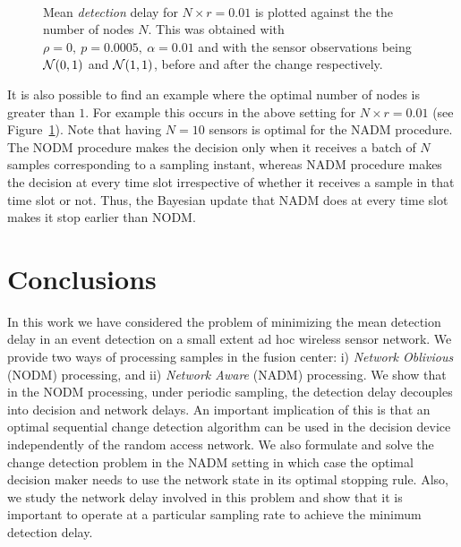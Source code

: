 \documentclass[acmtosn]{acmtrans2m}
\begin{document}
 
 \begin{figure}
   \centering \ 
   \caption{Mean \emph{detection} delay for $N\times r=0.01$ is plotted
     against the the number of nodes $N$. This was obtained with 
     $\rho=0,~p=0.0005,~\alpha=0.01$ and with the sensor observations
     being ${\cal{N}}(0,1)$ and ${\cal{N}}(1,1)$, before and after the
     change respectively.}
   \label{fig:decision-delay-01}
 \end{figure}
It is also possible to find an example where the optimal number of
nodes is greater than $1$. For example this occurs in the above
setting for $N \times r=0.01$ (see Figure~\ref{fig:decision-delay-01}).
Note that having $N=10$ sensors is optimal for the {\sf NADM} procedure. 
The {\sf NODM} procedure makes the decision only when it receives a batch
of $N$ samples corresponding to a sampling instant, whereas {\sf NADM}
procedure makes the decision at every time slot irrespective of 
whether it receives a sample in that time slot or not. Thus, the 
Bayesian update that {\sf NADM} does at every time slot makes it stop 
earlier than {\sf NODM}.


\section{Conclusions}
In this work we have considered the problem of minimizing the mean
detection delay in an event detection on a small extent ad hoc wireless
sensor network. We provide two ways of processing samples in the fusion
center: i) {\em Network Oblivious} ({\sf NODM}) processing, and ii) {\em
Network Aware} ({\sf NADM}) processing. We show that in the  {\sf NODM}
processing, under periodic sampling, the detection delay decouples into
decision and network delays. An important implication of this is that an
optimal sequential change detection algorithm can be used in the
decision device independently of the random access network. We also
formulate and solve the change detection problem in the {\sf NADM}
setting in which case the optimal decision maker needs to use the
network state in its optimal stopping rule. Also, we study the network
delay involved in this problem and show that it is important to operate
at a particular sampling rate to achieve the minimum detection delay.  
\end{document}
